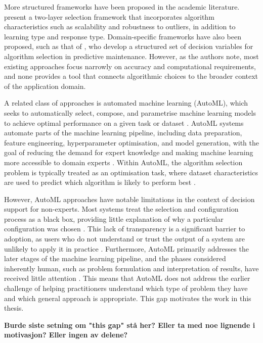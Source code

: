 More structured frameworks have been proposed in the academic literature. 
\textcite{sala2018selecting_ml_algorithm} present a two-layer selection 
framework that incorporates algorithm characteristics such as scalability 
and robustness to outliers, in addition to learning type and response type. 
Domain-specific frameworks have also been proposed, such as that of 
\textcite{arena2024conceptual_framework_ml_algorithm_selection_predictive_maintenance}, 
who develop a structured set of decision variables for algorithm selection 
in predictive maintenance. However, as the authors note, most existing 
approaches focus narrowly on accuracy and computational requirements, 
and none provides a tool that connects algorithmic choices to the broader 
context of the application domain.

A related class of approaches is automated machine learning (AutoML), 
which seeks to automatically select, compose, and parametrise machine 
learning models to achieve optimal performance on a given task or dataset 
\parencite{waring2020automated_machine_learning_review_state_of_the_art_opportunities_healthcare}. 
AutoML systems automate parts of the machine learning pipeline, including 
data preparation, feature engineering, hyperparameter optimisation, and 
model generation, with the goal of reducing the demand for expert knowledge 
and making machine learning more accessible to domain experts 
\parencite{he2021automl_survey_state_of_the_art}. 
Within AutoML, the algorithm selection problem is typically treated as an
optimisation task, where dataset characteristics are used to predict which 
algorithm is likely to perform best 
\parencite{barbudo2023eight_years_automl_categorisation_review_trends}.

However, AutoML approaches have notable limitations in the context of 
decision support for non-experts. Most systems treat the selection and 
configuration process as a black box, providing little explanation of why 
a particular configuration was chosen 
\parencite{barbudo2023eight_years_automl_categorisation_review_trends}. 
This lack of transparency is a significant barrier to adoption, as users 
who do not understand or trust the output of a system are unlikely to apply 
it in practice 
\parencite{waring2020automated_machine_learning_review_state_of_the_art_opportunities_healthcare}. 
Furthermore, AutoML primarily addresses the later stages of the machine 
learning pipeline, and the phases considered inherently human, such as 
problem formulation and interpretation of results, have received little 
attention \parencite{barbudo2023eight_years_automl_categorisation_review_trends}. 
This means that AutoML does not address the earlier challenge of helping 
practitioners understand which type of problem they have and which general 
approach is appropriate. This gap motivates the 
work in this thesis.

\textbf{Burde siste setning om "this gap" stå her? Eller ta med noe lignende i motivasjon? Eller ingen av delene?}
